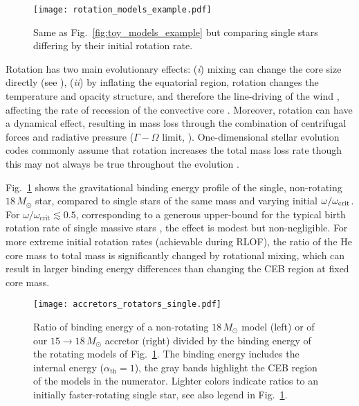 \documentclass[twocolumn,twocolappendix,trackchanges]{aastex63}
\DeclareRobustCommand{\Figref}[1]{Fig.~\ref{#1}}
\begin{document}
\begin{figure}[htbp]
  \centering
  \texttt{[image: rotation\_models\_example.pdf]}
  \caption{Same as \Figref{fig:toy_models_example} but comparing
    single stars differing by their initial rotation rate.}
  \label{fig:rotation_models_example}
\end{figure}

Rotation has two main evolutionary effects: (\emph{i}) mixing can change the core
size directly (see \citealt{heger:2000, maeder:00}), (\emph{ii}) by
inflating the equatorial region, rotation changes the temperature and
opacity structure, and therefore the line-driving of the wind
\cite[e.g.,][]{muller:2014, gagnier:2019}, affecting the
rate of recession of the convective core \citep[e.g.,][]{renzo:2017,
  renzo:2020ppi_conv}. Moreover, rotation can have a dynamical effect,
resulting in mass loss through the combination of centrifugal forces
and radiative pressure ($\Gamma-\Omega$ limit, \citealt{langer:1998}).
One-dimensional stellar evolution codes commonly assume that rotation
increases the total mass loss rate \citep[e.g.,][]{langer:1998,
  heger:2000} though this may not always be true throughout the
evolution \citep[e.g.,][]{gagnier:2019}.

\Figref{fig:rotation_models_example} shows the gravitational binding
energy profile of the single, non-rotating
$18\,M_\odot$ star, compared to single stars of the
same mass and varying initial $\omega/\omega_{\rm crit}$.  For
$\omega/\omega_\mathrm{crit}\lesssim 0.5$, corresponding to a generous
upper-bound for the typical birth rotation rate of single massive
stars \citep[e.g.,][]{ramirez-agudelo:2015}, the effect is modest but
non-negligible. For more extreme initial rotation rates (achievable
during RLOF), the ratio of the He core mass to total mass is
significantly changed by rotational mixing, which can result in larger
binding energy differences than changing the CEB region at fixed core
mass.

\begin{figure}[!htbp]
  \centering
  \texttt{[image: accretors\_rotators\_single.pdf]}
  \caption{Ratio of binding energy of a non-rotating
      $18\,M_\odot$ model (left) or of our $15\rightarrow18\,M_\odot$
      accretor (right) divided by the binding energy of the rotating
      models of \Figref{fig:rotation_models_example}. The binding
      energy includes the internal energy ($\alpha_\mathrm{th}=1$),
      the gray bands highlight the CEB region of the models in the
      numerator. Lighter colors indicate ratios to an initially
      faster-rotating single star, see also legend in
      \Figref{fig:rotation_models_example}.}
  \label{fig:accretors_rotators_single}
\end{figure}
\end{document}
